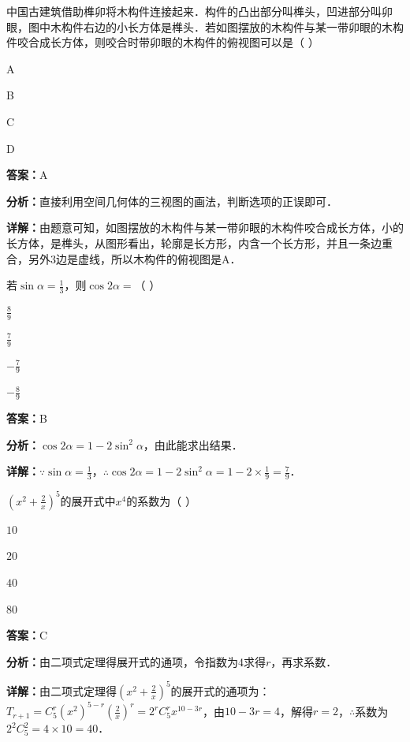 \begin{question}[points=5]
中国古建筑借助榫卯将木构件连接起来．构件的凸出部分叫榫头，凹进部分叫卯眼，图中木构件右边的小长方体是榫头．若如图摆放的木构件与某一带卯眼的木构件咬合成长方体，则咬合时带卯眼的木构件的俯视图可以是（ ）
\begin{choices}
  \item A
  \item B
  \item C
  \item D
\end{choices}
\begin{solution}
\textbf{答案：}A

\textbf{分析：}直接利用空间几何体的三视图的画法，判断选项的正误即可．

\textbf{详解：}由题意可知，如图摆放的木构件与某一带卯眼的木构件咬合成长方体，小的长方体，是榫头，从图形看出，轮廓是长方形，内含一个长方形，并且一条边重合，另外3边是虚线，所以木构件的俯视图是A．
\end{solution}
\end{question}

\begin{question}[points=5]
若$\sin\alpha=\frac{1}{3}$，则$\cos2\alpha=$（ ）
\begin{choices}
  \item $\frac{8}{9}$
  \item $\frac{7}{9}$
  \item $-\frac{7}{9}$
  \item $-\frac{8}{9}$
\end{choices}
\begin{solution}
\textbf{答案：}B

\textbf{分析：}$\cos2\alpha=1-2\sin^2\alpha$，由此能求出结果．

\textbf{详解：}$\because \sin\alpha=\frac{1}{3}$，$\therefore \cos2\alpha=1-2\sin^2\alpha=1-2\times\frac{1}{9}=\frac{7}{9}$．
\end{solution}
\end{question}

\begin{question}[points=5]
$(x^2+\frac{2}{x})^5$的展开式中$x^4$的系数为（ ）
\begin{choices}
  \item $10$
  \item $20$
  \item $40$
  \item $80$
\end{choices}
\begin{solution}
\textbf{答案：}C

\textbf{分析：}由二项式定理得展开式的通项，令指数为4求得$r$，再求系数．

\textbf{详解：}由二项式定理得$(x^2+\frac{2}{x})^5$的展开式的通项为：$T_{r+1}=C_5^r (x^2)^{5-r}(\frac{2}{x})^r=2^r C_5^r x^{10-3r}$，由$10-3r=4$，解得$r=2$，$\therefore$系数为$2^2 C_5^2=4\times10=40$．
\end{solution}
\end{question}

